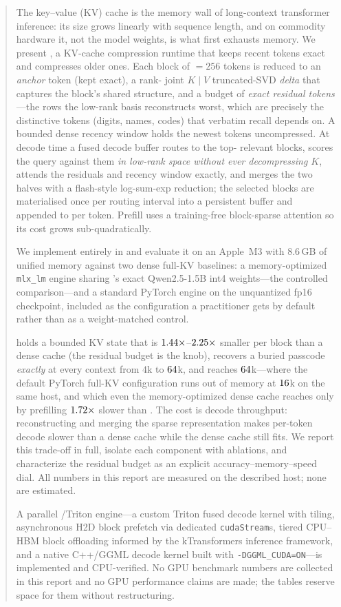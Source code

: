 \begin{abstract}
\noindent
The key--value (KV) cache is the memory wall of long-context transformer inference: its
size grows linearly with sequence length, and on commodity hardware it, not the model
weights, is what first exhausts memory. We present \dkv{}, a KV-cache compression runtime
that keeps recent tokens exact and compresses older ones. Each block of \bs${=}256$ tokens is
reduced to an \emph{anchor} token (kept exact), a rank-\rank{} joint $K\!\mid\!V$ truncated-SVD
\emph{delta} that captures the block's shared structure, and a budget of \maxres{} \emph{exact
residual tokens}---the rows the low-rank basis reconstructs worst, which are precisely the
distinctive tokens (digits, names, codes) that verbatim recall depends on. A bounded dense
recency window holds the newest tokens uncompressed. At decode time a fused decode buffer
routes to the top-\topk{} relevant blocks, scores the query against them \emph{in
low-rank space without ever decompressing $K$}, attends the residuals and recency window exactly,
and merges the two halves with a flash-style log-sum-exp reduction; the selected blocks are
materialised once per routing interval into a persistent buffer and appended to per token.
Prefill uses a training-free block-sparse attention so its cost grows sub-quadratically.

We implement \dkv{} entirely in \mlxe{} and evaluate it on an Apple~M3 with $8.6$\,GB of unified
memory against two dense full-KV baselines: a memory-optimized \texttt{mlx\_lm} engine sharing
\dkv{}'s exact Qwen2.5-1.5B int4 weights---the controlled comparison---and a standard PyTorch
engine on the unquantized fp16 checkpoint, included as the configuration a practitioner gets by
default rather than as a weight-matched control.

\dkv{} holds a bounded KV state that is $\ratioDefault\times$--$\ratioPreset\times$ smaller
per block than a dense cache (the residual budget \maxres{} is the knob), recovers a buried
passcode \emph{exactly} at every context from $4$k to $\reachK$k, and reaches $\reachK$k---where the
default PyTorch full-KV configuration runs out of memory at $\ptOOMK$k on the same host, and which
even the memory-optimized dense cache reaches only by prefilling $\pfSpeedupSixtyFourK\times$ slower
than \dkv{}. The cost is decode throughput: reconstructing and merging the sparse
representation makes per-token decode slower than a dense cache while the dense cache still fits. We
report this trade-off in full, isolate each component with ablations, and characterize the
residual budget as an explicit accuracy--memory--speed dial. All numbers in this report are
measured on the described host; none are estimated.

A parallel \cuda{}/Triton engine---a custom Triton fused decode kernel with
 tiling, asynchronous H2D block prefetch via dedicated \texttt{cudaStream}s,
tiered CPU--HBM block offloading informed by the kTransformers inference framework, and a native
C++/GGML decode kernel built with \texttt{-DGGML\_CUDA=ON}---is implemented and CPU-verified. No GPU
benchmark numbers are collected in this report and no GPU performance claims are made; the tables
reserve space for them without restructuring.
\end{abstract}
